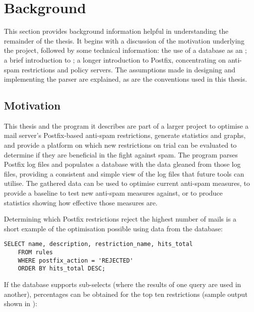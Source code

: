 \section{Background}

\label{background}

This section provides background information helpful in understanding the
remainder of the thesis.  It begins with a discussion of the motivation
underlying the project, followed by some technical information: the use of
a database as an \API{}\@; a brief introduction to \SMTP{}\@; a longer
introduction to Postfix, concentrating on anti-spam restrictions and policy
servers.  The assumptions made in designing and implementing the parser are
explained, as are the conventions used in this thesis.

\subsection{Motivation}

\label{motivation}

This thesis and the program it describes are part of a larger project to
optimise a mail server's Postfix-based anti-spam restrictions, generate
statistics and graphs, and provide a platform on which new restrictions on
trial can be evaluated to determine if they are beneficial in the fight
against spam.  The program parses Postfix log files and populates a
database with the data gleaned from those log files, providing a consistent
and simple view of the log files that future tools can utilise.  The
gathered data can be used to optimise current anti-spam measures, to
provide a baseline to test new anti-spam measures against, or to produce
statistics showing how effective those measures are.

Determining which Postfix restrictions reject the highest number of mails
is a short example of the optimisation possible using data from the
database:

\begin{verbatim}
SELECT name, description, restriction_name, hits_total
    FROM rules
    WHERE postfix_action = 'REJECTED'
    ORDER BY hits_total DESC;
\end{verbatim}

If the database supports sub-selects (where the results of one query are
used in another), percentages can be obtained for the top ten restrictions
(sample output shown in ):

